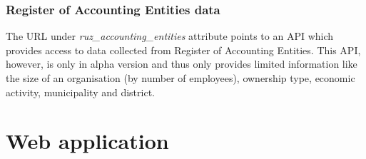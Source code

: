 \documentclass[thesis=B,english]{FITthesis}[2012/06/26]
\begin{document}
\subsubsection{Register of Accounting Entities data}
	The URL under \emph{ruz\_accounting\_entities} attribute points to an API which provides access to data collected from Register of Accounting Entities. This API, however, is only in alpha version and thus only provides limited information like the size of an organisation (by number of employees), ownership type, economic activity, municipality and district.

	\section{Web application}
\end{document}
